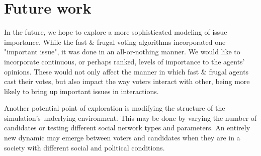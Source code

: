 \section{Future work}
\label{sec:future}








In the future, we hope to explore a more
sophisticated modeling of issue importance. While the fast \& frugal
voting algorithms incorporated one "important issue", it was done in
an all-or-nothing manner. We would like to incorporate continuous, or
perhaps ranked, levels of importance to the agents' opinions. These 
would not only affect the manner in which fast \& frugal
agents cast their votes, but also impact the way voters interact
with other, being more likely to bring up important issues in interactions.

Another potential point of exploration is modifying the structure of the
simulation's underlying environment. This may be done by varying the 
number of candidates or testing 
different social network types and parameters. An entirely new dynamic may 
emerge between voters and candidates when they are in a society with different 
social and political conditions.
